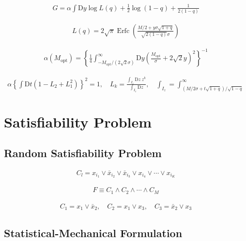 \documentclass{article}
\begin{document}
\begin{align*}
G = \alpha \int \mathrm{D} y \log L(q) + \frac{1}{2} \log (1 - q) + \frac{1}{2(1 - q)} \tag{9.32}
\end{align*}

\begin{align*}
L(q) = 2 \sqrt{\pi} \operatorname{Erfc} \left( \frac{M / 2 + y \sigma \sqrt{1 + q}}{\sqrt{2(1 - q)} \sigma} \right) \tag{9.33}
\end{align*}

\begin{align*}
\alpha(M_{\mathrm{opt}}) = \left\{ \frac{1}{4} \int_{-M_{\mathrm{opt}} / (2 \sqrt{2} \sigma)}^{\infty} \mathrm{D} y \left( \frac{M_{\mathrm{opt}}}{\sigma} + 2 \sqrt{2} y \right)^2 \right\}^{-1} \tag{9.34}
\end{align*}

\begin{align*}
\alpha \left\{ \int \mathrm{D} t \left( 1 - L_2 + L_1^2 \right) \right\}^2 = 1, \quad L_k = \frac{\int_{I_z} \mathrm{D} z ~ z^k}{\int_{I_z} \mathrm{D} z}, \quad \int_{I_z} = \int_{(M / 2\sigma + t \sqrt{1+q}) / \sqrt{1-q}}^{\infty} \tag{9.35}
\end{align*}

\clearpage

\section{Satisfiability Problem}

\subsection{Random Satisfiability Problem}

\begin{align*}
C_l = x_{i_1} \vee \bar{x}_{i_2} \vee \bar{x}_{i_3} \vee x_{i_4} \vee \cdots \vee x_{i_K} \tag{9.36}
\end{align*}

\begin{align*}
F \equiv C_1 \wedge C_2 \wedge \cdots \wedge C_M \tag{9.37}
\end{align*}

\begin{align*}
C_1 = x_1 \vee \bar{x}_2, \quad C_2 = x_1 \vee x_3, \quad C_3 = \bar{x}_2 \vee x_3 \tag{9.38}
\end{align*}

\subsection{Statistical-Mechanical Formulation}
\end{document}

